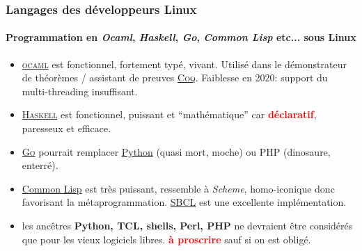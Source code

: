 \documentclass[xcolor=svgnames,final,smaller,a4]{beamer}
\begin{document}
\begin{frame}
  \frametitle{Langages des développeurs Linux}
  \framesubtitle{Programmation en \textit{Ocaml},  \textit{Haskell}, \textit{Go}, \textit{Common Lisp} etc... sous Linux}

  \begin{itemize}
\item \href{https://www.ocaml.org/}{\textsc{ocaml}} est fonctionnel,
  fortement typé, vivant. Utilisé dans le démonstrateur de théorèmes /
  assistant de preuves
  \href{https://coq.inria.fr/}{\textsc{Coq}}. Faiblesse en 2020:
  support du multi-threading insuffisant.
  
\item  \href{https://www.haskell.org/}{\textsc{Haskell}} est fonctionnel,
  puissant et ``mathématique'' car
  \textcolor{red}{\textbf{déclaratif}}, paresseux et efficace. 

\item  \href{https://go-lang.org}{\textsc{Go}} pourrait remplacer \href{http://python.org/}{Python} (quasi mort, moche) ou PHP (dinosaure, enterré).


\item  \href{https://fr.wikipedia.org/wiki/Common_Lisp}{Common Lisp} est très puissant, ressemble à \textit{Scheme}, homo-iconique donc favorisant la métaprogrammation. \href{https://sbcl.org/}{SBCL} est une excellente implémentation.

\item les ancêtres \textbf{Python, TCL, shells, Perl, PHP} ne devraient être considérés
  que pour les vieux logiciels libres. \textcolor{red}{\textbf{à
      proscrire}} sauf si on est obligé.
  \end{itemize}
\end{frame}
\end{document}
